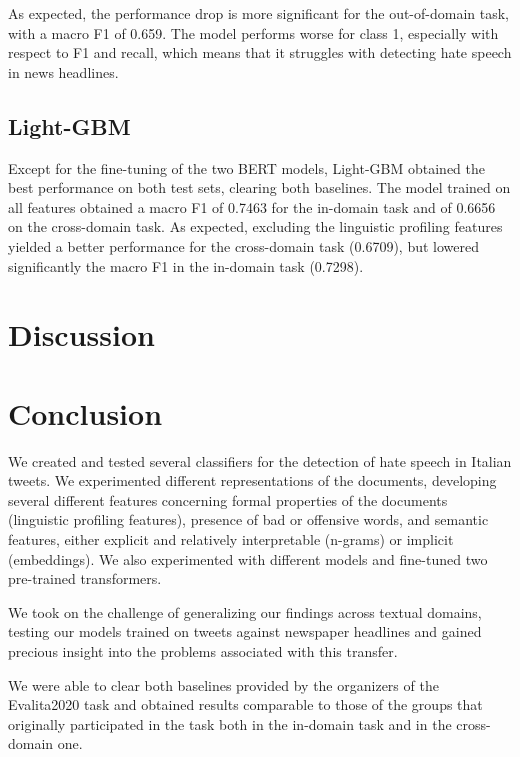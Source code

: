 \documentclass[a4paper, 9pt, twocolumn, DIV=calc]{scrartcl}
\begin{document}
As expected, the performance drop is more significant for the out-of-domain task, with a macro F1 of 0.659. The model performs worse for class 1, especially with respect to F1 and recall, which means that it struggles with detecting hate speech in news headlines.

\subsection{Light-GBM}
Except for the fine-tuning of the two BERT models, Light-GBM obtained the best performance on both test sets, clearing both baselines.
The model trained on all features obtained a macro F1 of 0.7463 for the in-domain task and of 0.6656 on the cross-domain task.
As expected, excluding the linguistic profiling features yielded a better performance for the cross-domain task (0.6709), but lowered significantly the macro F1 in the in-domain task (0.7298).



\section{Discussion}


\section{Conclusion}
We created and tested several classifiers for the detection of hate speech in Italian tweets.
We experimented different representations of the documents, developing several different features concerning formal properties of the documents (linguistic profiling features), presence of bad or offensive words, and semantic features, either explicit and relatively interpretable (n-grams) or implicit (embeddings).
We also experimented with different models and fine-tuned two pre-trained transformers.

We took on the challenge of generalizing our findings across textual domains, testing our models trained on tweets against newspaper headlines and gained precious insight into the problems associated with this transfer.

We were able to clear both baselines provided by the organizers of the Evalita2020 task and obtained results comparable to those of the groups that originally participated in the task both in the in-domain task and in the cross-domain one.

\printbibliography{}
\end{document}
